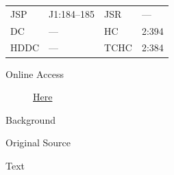 					\begin{tabular}{p{0.5in}p{1in}p{0.5in}p{1in}}
					JSP	 	& J1:184--185		& JSR 		& --- \\
					DC	 	& ---				& HC 		& 2:394 \\
					HDDC 	& ---				& TCHC 		& 2:384 \\
					\end{tabular}
				
				\begin{description}
					\item[Online Access] \href{https://www.josephsmithpapers.org/paper-summary/discourse-12-february-1836/1}{Here}
				\end{description}
				
				\begin{description}
					\item[Background]
				\end{description}
				
				
				\begin{description}
					\item[Original Source]
				\end{description}
				
					
				
				\begin{description}
					\item[Text]
				\end{description}
				
